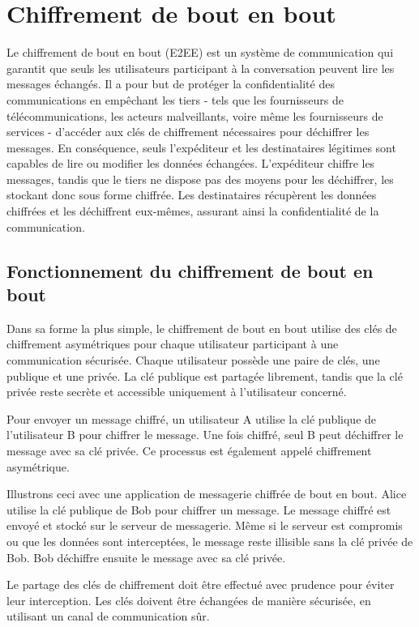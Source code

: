 \section{Chiffrement de bout en bout}

Le chiffrement de bout en bout (E2EE) est un système de communication qui garantit que seuls les utilisateurs participant à la conversation peuvent lire les messages échangés. Il a pour but de protéger la confidentialité des communications en empêchant les tiers - tels que les fournisseurs de télécommunications, les acteurs malveillants, voire même les fournisseurs de services - d'accéder aux clés de chiffrement nécessaires pour déchiffrer les messages. En conséquence, seuls l'expéditeur et les destinataires légitimes sont capables de lire ou modifier les données échangées. L'expéditeur chiffre les messages, tandis que le tiers ne dispose pas des moyens pour les déchiffrer, les stockant donc sous forme chiffrée. Les destinataires récupèrent les données chiffrées et les déchiffrent eux-mêmes, assurant ainsi la confidentialité de la communication.

\subsection{Fonctionnement du chiffrement de bout en bout}

Dans sa forme la plus simple, le chiffrement de bout en bout utilise des clés de chiffrement asymétriques pour chaque utilisateur participant à une communication sécurisée. Chaque utilisateur possède une paire de clés, une publique et une privée. La clé publique est partagée librement, tandis que la clé privée reste secrète et accessible uniquement à l'utilisateur concerné.

Pour envoyer un message chiffré, un utilisateur A utilise la clé publique de l'utilisateur B pour chiffrer le message. Une fois chiffré, seul B peut déchiffrer le message avec sa clé privée. Ce processus est également appelé chiffrement asymétrique.

Illustrons ceci avec une application de messagerie chiffrée de bout en bout. Alice utilise la clé publique de Bob pour chiffrer un message. Le message chiffré est envoyé et stocké sur le serveur de messagerie. Même si le serveur est compromis ou que les données sont interceptées, le message reste illisible sans la clé privée de Bob. Bob déchiffre ensuite le message avec sa clé privée.

Le partage des clés de chiffrement doit être effectué avec prudence pour éviter leur interception. Les clés doivent être échangées de manière sécurisée, en utilisant un canal de communication sûr.

